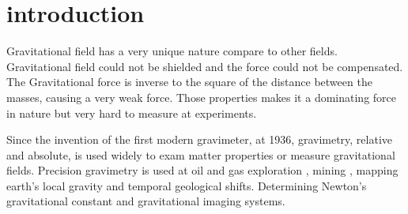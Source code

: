 \documentclass[\main/master.tex]{subfiles}
\begin{document}
\chapter{introduction}\label{chp:example-1}

Gravitational field has a very unique nature compare to other fields. Gravitational field could not be shielded and the force could not be compensated. The Gravitational force is inverse to the square of the distance between the masses, causing a very weak force. Those properties makes it a dominating force in nature but very hard to measure at experiments.
\par
Since the invention of the first modern gravimeter, at 1936, gravimetry, relative and absolute, is used widely to exam matter properties or measure gravitational fields. Precision gravimetry \cite{Wahr04,Bingham10,Bell98,Leeuwen00,Diorio03,Romaides01,Peters01,Luther82,Kuroda95,Karagioz96,Bagley97,Gundlach00,Quinn01,Armstrong03,Kleinevoss99,Parks10,Peters99,Mcguirk02,Dimopoulos07,Lamporesi08,Sorrentino10,Rosi14,Goodkind99} is used at oil and gas exploration \cite{Bell98}, mining \cite{Leeuwen00}, mapping earth's local gravity \cite{Wahr04,Bingham10} and temporal geological shifts. Determining Newton's gravitational constant \cite{Luther82, Kuroda95, Karagioz96, Bagley97, Gundlach00, Quinn01, Armstrong03, Kleinevoss99, Parks10, Peters99, Mcguirk02, Dimopoulos07, Lamporesi08, Sorrentino10, Rosi14} and gravitational imaging systems. 
\end{document}
